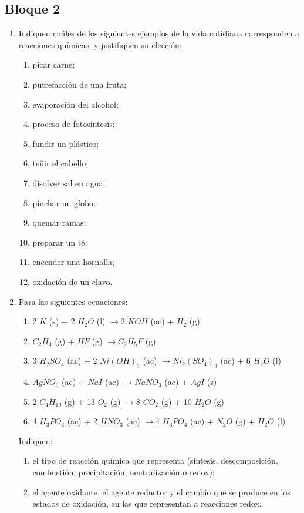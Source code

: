 \documentclass[../Práctica.root.tex]{subfiles}
\newcommand{\lra}{\ensuremath{\longrightarrow{}}}
\begin{document}
\subsection{Bloque 2}
\begin{enumerate}
    \item Indiquen cuáles de los siguientes ejemplos de la vida cotidiana corresponden a reacciones
          químicas, y justifiquen su elección:
          \begin{enumerate}
              \item picar carne;
              \item putrefacción de una fruta;
              \item evaporación del alcohol;
              \item proceso de fotosíntesis;
              \item fundir un plástico;
              \item teñir el cabello;
              \item disolver sal en agua;
              \item pinchar un globo;
              \item quemar ramas;
              \item preparar un té;
              \item encender una hornalla;
              \item oxidación de un clavo.
          \end{enumerate}

    \item Para las siguientes ecuaciones:
          \begin{enumerate}
              \item 2 $K$ (s) + 2 $H_2O$ (l) \lra 2 $KOH$ (ac) + $H_2$ (g)
              \item $C_2H_4$ (g) + $HF$ (g) \lra $C_2H_5F$ (g)
              \item 3 $H_2SO_4$ (ac) + 2 $Ni(OH)_3$ (ac) \lra $Ni_2(SO_4)_3$ (ac) + 6 $H_2O$ (l)
              \item $AgNO_3$ (ac) + $NaI$ (ac) \lra $NaNO_3$ (ac) + $AgI$ (s)
              \item 2 $C_4H_{10}$ (g) + 13 $O_2$ (g) \lra 8 $CO_2$ (g) + 10 $H_2O$ (g)
              \item 4 $H_3PO_3$ (ac) + 2 $HNO_3$ (ac) \lra 4 $H_3PO_4$ (ac) + $N_2O$ (g) + $H_2O$ (l)
          \end{enumerate}
          Indiquen:
          \begin{enumerate}
              \item el tipo de reacción química que representa (síntesis, descomposición, combustión,
                    precipitación, neutralización o redox);
              \item el agente oxidante, el agente reductor y el cambio que se produce en los estados de
                    oxidación, en las que representan a reacciones redox.
          \end{enumerate}


\end{enumerate}
\end{document}
